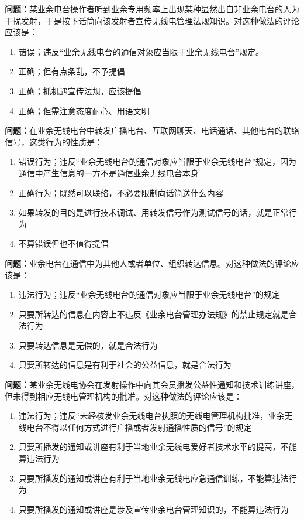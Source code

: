 \documentclass{ctexbook}
\begin{document}
\textbf{问题：}某业余电台操作者听到业余专用频率上出现某种显然出自非业余电台的人为干扰发射，于是按下话筒向该发射者宣传无线电管理法规知识。对这种做法的评论应该是：
\begin{enumerate}[label=\Alph*), leftmargin=3em]
\item 错误；违反“业余无线电台的通信对象应当限于业余无线电台”规定。
\item 正确；但有点条乱，不予提倡
\item 正确；抓机遇宣传法规，应该提倡
\item 正确；但需注意态度耐心、用语文明
\end{enumerate}

\textbf{问题：}在业余无线电台中转发广播电台、互联网聊天、电话通话、其他电台的联络信号，这类行为的性质是：
\begin{enumerate}[label=\Alph*), leftmargin=3em]
\item 错误行为；违反“业余无线电台的通信对象应当限于业余无线电台”规定，因为通信中产生信息的一方不是通信业余无线电台本身
\item 正确行为；既然可以联络，不必要限制向话筒送什么内容
\item 如果转发的目的是进行技术调试、用转发信号作为测试信号的话，就是正常行为
\item 不算错误但也不值得提倡
\end{enumerate}

\textbf{问题：}业余电台在通信中为其他人或者单位、组织转达信息。对这种做法的评论应该是：
\begin{enumerate}[label=\Alph*), leftmargin=3em]
\item 违法行为；违反“业余无线电台的通信对象应当限于业余无线电台”的规定
\item 只要所转达的信息在内容上不违反《业余电台管理办法规》的禁止规定就是合法行为
\item 只要转达信息是无偿的，就是合法行为
\item 只要所转达的信息是有利于社会的公益信息，就是合法行为
\end{enumerate}

\textbf{问题：}某业余无线电协会在发射操作中向其会员播发公益性通知和技术训练讲座，但未得到相应无线电管理机构的批准。对这种做法的评论应该是：
\begin{enumerate}[label=\Alph*), leftmargin=3em]
\item 违法行为；违反“未经核发业余无线电台执照的无线电管理机构批准，业余无线电台不得以任何方式进行广播或者发射通播性质的信号”的规定
\item 只要所播发的通知或讲座有利于当地业余无线电爱好者技术水平的提高，不能算违法行为
\item 只要所播发的通知或讲座有利于当地业余无线电应急通信训练，不能算违法行为
\item 只要所播发的通知或讲座是涉及宣传业余电台管理知识的，不能算违法行为
\end{enumerate}
\end{document}
